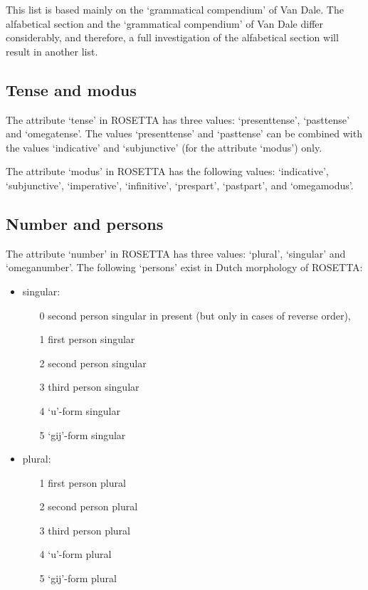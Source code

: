 This list is based mainly on the `grammatical compendium' of Van Dale. The 
alfabetical section and the `grammatical compendium' of Van Dale differ 
considerably, and therefore, a full investigation of the alfabetical section 
will result in another list.

\subsection{Tense and modus}

The attribute `tense' in ROSETTA has three values: 
`presenttense', `pasttense' and `omegatense'.
The values `presenttense' and `pasttense' can be combined with the values
`indicative' and `subjunctive' (for the attribute `modus') only. 

The attribute `modus' in ROSETTA has the following values: 
`indicative', `subjunctive', `imperative', `infinitive', `prespart', 
`pastpart', and `omegamodus'.

\subsection{Number and persons}

The attribute `number' in ROSETTA has three values: 
`plural', `singular' and `omeganumber'.
The following `persons' exist in Dutch morphology of ROSETTA: 
\begin{itemize}
  \item singular:
    \begin{itemize} 
      \item [0] second person singular in present 
                (but only in cases of reverse order),
      \item [1] first person singular
      \item [2] second person singular
      \item [3] third person singular
      \item [4] `u'-form singular
      \item [5] `gij'-form singular
    \end{itemize}
  \item plural:
    \begin{itemize}
      \item [1] first person plural
      \item [2] second person plural
      \item [3] third person plural
      \item [4] `u'-form plural
      \item [5] `gij'-form plural
  \end{itemize}
\end{itemize}


